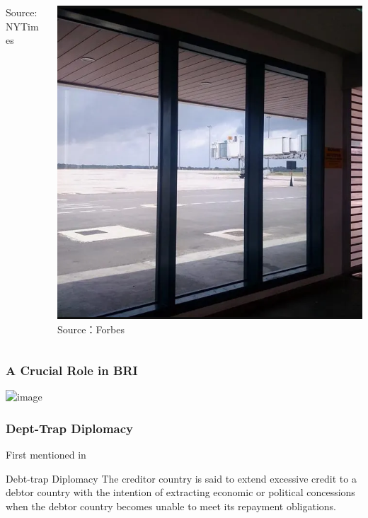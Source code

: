 \documentclass[mathserif]{beamer}
\begin{document}
\begin{frame}
\begin{columns}
\begin{column}{0.48\textwidth}
                    \footnotesize {Source: NYTimes}
            \end{column}%
            \pause%
            \begin{column}{0.48\textwidth}
                    \includegraphics[width = \textwidth]{fig/empty_airport.png}
                    \footnotesize {Source：Forbes}
            \end{column}
        \end{columns}
    \end{frame}

    \begin{frame}
        \frametitle{A Crucial Role in BRI}
        \includegraphics<1>[width = \textwidth]{fig/BRI.png}%
    \end{frame}

    \begin{frame}
        \frametitle{Dept-Trap Diplomacy}
            First mentioned in \citet{Chellaney_2017}
            \begin{block}{Debt-trap Diplomacy}
               The creditor country is said to extend excessive credit to a debtor country with the intention of extracting economic or political concessions when the debtor country becomes unable to meet its repayment obligations.
            \end{block}
    \end{frame}
\end{document}
